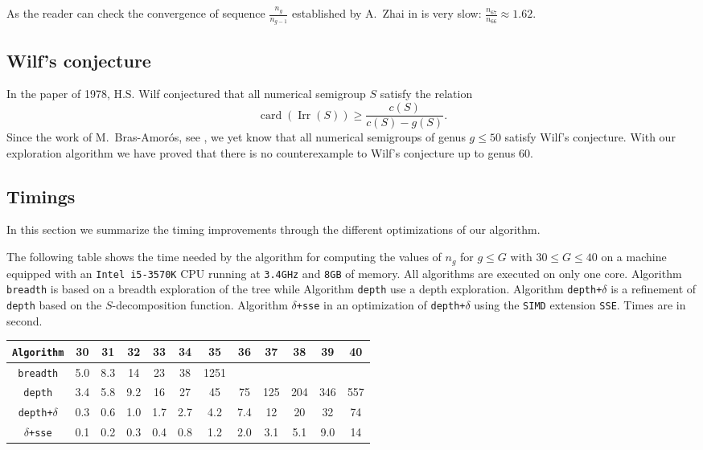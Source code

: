 \documentclass[reqno]{amsart}
\theoremstyle{plain}
\theoremstyle{definition}
\renewcommand{\leq}{\leqslant}
\renewcommand{\geq}{\geqslant}
\newcommand{\SIMD}{\texttt{SIMD}\xspace}
\newcommand{\SSE}{\texttt{SSE}\xspace}
\renewcommand{\tt}[1]{\texttt{#1}}
\DeclareMathOperator{\Irr}{Irr}
\DeclareMathOperator{\card}{card}
\begin{document}
As the reader can check the convergence of sequence $\frac{n_g}{n_{g-1}}$ established by A.~Zhai in \cite{Zhai} is very slow: $\frac{n_{67}}{n_{66}}\approx 1.62$.


\subsection{Wilf's conjecture}

In the paper \cite{Wilf} of 1978, H.S. Wilf conjectured that all numerical semigroup $S$ satisfy the relation 
\[
\card(\Irr(S))\geq \frac{c(S)}{c(S)-g(S)}.
\]
Since the work of M.~Bras-Amor{\'o}s, see \cite{BrasAmoros2008}, we yet know that all numerical semigroups of genus $g\leq 50$ satisfy Wilf's conjecture. With our exploration algorithm we have proved that there is no counterexample to Wilf's conjecture up to genus $60$.


\subsection{Timings}

In this section we summarize the timing improvements through the different 
optimizations of our algorithm. 


The following table shows the time needed by the algorithm for computing 
the values of $n_g$ 
for $g\leq G$ with $30\leq G \leq 40$
on a machine equipped with  an \tt{Intel\texttrademark{} i5-3570K} CPU running at \texttt{3.4GHz}
and \texttt{8GB} of memory.
All algorithms are executed on only one core. Algorithm \texttt{breadth} is 
based on a breadth exploration of the tree while Algorithm \texttt{depth} 
use a depth exploration. Algorithm \texttt{depth+$\delta$} is a refinement of 
\texttt{depth} based on the $S$-decomposition function. Algorithm 
\texttt{$\delta$+sse} in an optimization of \texttt{depth+$\delta$} using the 
\SIMD extension \SSE. Times are in second.

\begin{center}
\begin{tabular}{|c|c|c|c|c|c|c|c|c|c|c|c|}
\hline
\texttt{Algorithm}					&  30 &  31 &  32 &  33 &  34 &   35 &  36 &  37 &  38 &  39 &  40 \\
\hline
\texttt{breadth}		& 5.0 & 8.3 &  14 &  23 &  38 & 1251 &     &     &     &     &     \\
\texttt{depth}			& 3.4 & 5.8 & 9.2 &  16 &  27 &   45 &  75 & 125 & 204 & 346 & 557 \\
\texttt{depth+$\delta$}	& 0.3 & 0.6 & 1.0 & 1.7 & 2.7 &  4.2 & 7.4 &  12 &  20 &  32 & 74  \\
\texttt{$\delta$+sse}	& 0.1 & 0.2 & 0.3 & 0.4 & 0.8 &  1.2 & 2.0 & 3.1 & 5.1 & 9.0 & 14 \\
\hline
\end{tabular}
\end{center}
\end{document}
